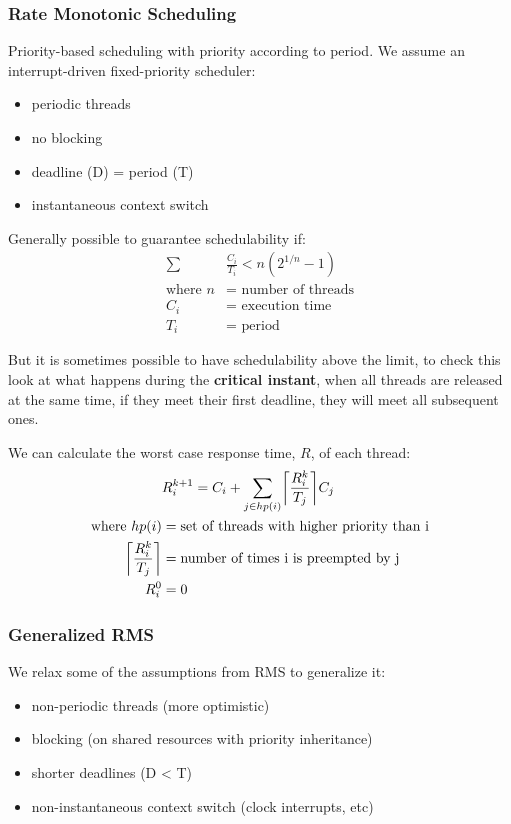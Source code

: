 \documentclass[]{article}
\theoremstyle{definition}
\DeclarePairedDelimiter{\ceil}{\lceil}{\rceil}
\begin{document}
	\subsubsection{Rate Monotonic Scheduling}
	Priority-based scheduling with priority according to period. We assume an interrupt-driven fixed-priority scheduler:
	\begin{itemize}
		\item periodic threads
		\item no blocking
		\item deadline (D) = period (T)
		\item instantaneous context switch
	\end{itemize}
	Generally possible to guarantee schedulability if:
	\begin{align*}
		\sum &\frac{C_i}{T_i} < n(2^{1/n} - 1) \\
		\text{where } n &= \text{ number of threads} \\ 
		C_i &= \text{ execution time} \\ 
		T_i &= \text{ period}
	\end{align*}
	
	But it is sometimes possible to have schedulability above the limit, to check this look at what happens during the \textbf{critical instant}, when all threads are released at the same time, if they meet their first deadline, they will meet all subsequent ones. 

	We can calculate the worst case response time, $R$, of each thread:
	\begin{align*}
		&R_i^{k+1} = C_i + \sum_{j \in hp(i)} \ceil*{\frac{R_i^k}{T_j}}C_j \\
		\text{where } hp(i) &= \text{set of threads with higher priority than i} \\
		\ceil*{\frac{R_i^k}{T_j}} &= \text{number of times i is preempted by j} \\
		R_i^0 &= 0
	\end{align*}

	\subsubsection{Generalized RMS}
	We relax some of the assumptions from RMS to generalize it:
	\begin{itemize}
		\item non-periodic threads (more optimistic)
		\item blocking (on shared resources with priority inheritance)
		\item shorter deadlines (D < T)
		\item non-instantaneous context switch (clock interrupts, etc)
	\end{itemize}
\end{document}
